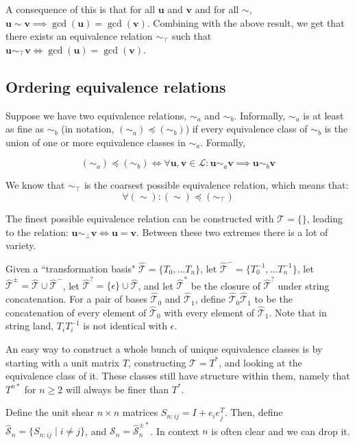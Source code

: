 \documentclass{article}
\def\u{\textbf{u}}
\def\v{\textbf{v}}
\def\L{\mathcal{L}}
\def\T{\mathcal{T}}
\def\S{\mathcal{S}}
\begin{document}
A consequence of this is that for all $\u$ and $\v$ and for all $\sim$, $\u \sim \v\implies \gcd(\u)=\gcd(\v)$. Combining with the above result, we get that there exists an equivalence relation $\sim_\top$ such that $\u \sim_\top \v \iff \gcd(\u)=\gcd(\v)$.

\subsection{Ordering equivalence relations}
Suppose we have two equivalence relations, $\sim_a$ and $\sim_b$. Informally, $\sim_a$ is at least as fine as $\sim_b$ (in notation, $(\sim_a)\preceq (\sim_b)$) if every equivalence class of $\sim_b$ is the union of one or more equivalence classes in $\sim_a$. Formally, 

\begin{equation}
    (\sim_a) \preceq (\sim_b) \iff \forall \u, \v\in\L: \u \sim_a \v \implies \u \sim_b \v
\end{equation}

We know that $\sim_\top$ is the coarsest possible equivalence relation, which means that:
\begin{equation}
    \forall (\sim): (\sim) \preceq (\sim_\top)
\end{equation}

The finest possible equivalence relation can be constructed with $\T=\{\}$, leading to the relation: $\u\sim_\bot\v\iff\u=\v$. Between these two extremes there is a lot of variety.

Given a ``transformation basis" $\hat{\T} = \{T_0,\ldots T_n\}$, let $\hat{\T}^- = \{T_0^{-1},\ldots T_n^{-1}\}$, let $\hat{\T}^\pm = \hat{\T}\cup\hat{\T}^-$, let $\hat{\T}^?=\{\epsilon\}\cup \hat{\T}$, and let $\hat{\T}^*$ be the closure of $\hat{\T}^?$ under string concatenation. For a pair of bases $\hat{\T}_0$ and $\hat{\T}_1$, define $\hat{\T}_0\hat{\T}_1$ to be the concatenation of every element of $\hat{\T}_0$ with every element of $\hat{\T}_1$. Note that in string land, $T_iT_i^{-1}$ is not identical with $\epsilon$.

An easy way to construct a whole bunch of unique equivalence classes is by starting with a unit matrix $T$, constructing $\T=T^*$, and looking at the equivalence class of it. These classes still have structure within them, namely that $T^{n*}$ for $n\geq 2$ will always be finer than $T^*$.

Define the unit shear $n\times n$ matrices $S_{n:ij}=I+e_ie_j^T$. Then, define $\hat{\S}_n=\{S_{n:ij}\mid i\not=j\}$, and $\S_n = \hat{\S}_n^{\pm*}$. In context $n$ is often clear and we can drop it.
\end{document}
